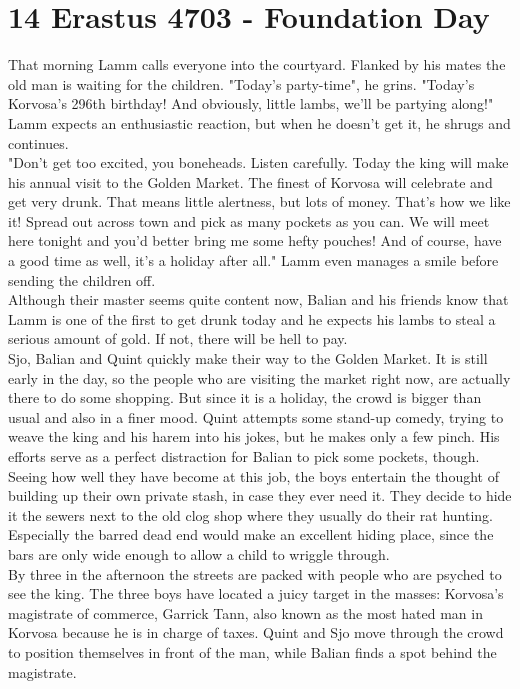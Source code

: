 \section{14 Erastus 4703 - Foundation Day}

That morning Lamm calls everyone into the courtyard. Flanked by his mates the old man is waiting for the children. "Today's party-time", he grins. "Today's Korvosa's 296th birthday! And obviously, little lambs, we'll be partying along!" Lamm expects an enthusiastic reaction, but when he doesn't get it, he shrugs and continues.\\

"Don't get too excited, you boneheads. Listen carefully. Today the king will make his annual visit to the Golden Market. The finest of Korvosa will celebrate and get very drunk. That means little alertness, but lots of money. That's how we like it! Spread out across town and pick as many pockets as you can. We will meet here tonight and you'd better bring me some hefty pouches! And of course, have a good time as well, it's a holiday after all." Lamm even manages a smile before sending the children off.\\

Although their master seems quite content now, Balian and his friends know that Lamm is one of the first to get drunk today and he expects his lambs to steal a serious amount of gold. If not, there will be hell to pay.\\

Sjo, Balian and Quint quickly make their way to the Golden Market. It is still early in the day, so the people who are visiting the market right now, are actually there to do some shopping. But since it is a holiday, the crowd is bigger than usual and also in a finer mood. Quint attempts some stand-up comedy, trying to weave the king and his harem into his jokes, but he makes only a few pinch. His efforts serve as a perfect distraction for Balian to pick some pockets, though. Seeing how well they have become at this job, the boys entertain the thought of building up their own private stash, in case they ever need it. They decide to hide it the sewers next to the old clog shop where they usually do their rat hunting. Especially the barred dead end would make an excellent hiding place, since the bars are only wide enough to allow a child to wriggle through.\\

By three in the afternoon the streets are packed with people who are psyched to see the king. The three boys have located a juicy target in the masses: Korvosa's magistrate of commerce, Garrick Tann, also known as the most hated man in Korvosa because he is in charge of taxes. Quint and Sjo move through the crowd to position themselves in front of the man, while Balian finds a spot behind the magistrate.\\

